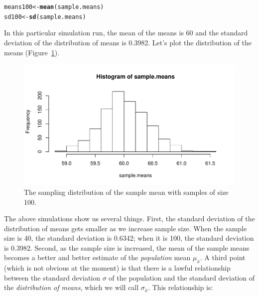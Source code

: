 \documentclass[12pt]{book}\usepackage[]{graphicx}\usepackage[]{color}
\makeatletter
\def\maxwidth{ %
  \ifdim\Gin@nat@width>\linewidth
    \linewidth
  \else
    \Gin@nat@width
  \fi
}
\newcommand{\hlstd}[1]{\textcolor[rgb]{0.345,0.345,0.345}{#1}}%
\newcommand{\hlkwb}[1]{\textcolor[rgb]{0.69,0.353,0.396}{#1}}%
\newcommand{\hlkwd}[1]{\textcolor[rgb]{0.737,0.353,0.396}{\textbf{#1}}}%
\newenvironment{kframe}{%
 \def\at@end@of@kframe{}%
 \ifinner\ifhmode%
  \def\at@end@of@kframe{\end{minipage}}%
  \begin{minipage}{\columnwidth}%
 \fi\fi%
 \def\FrameCommand##1{\hskip\@totalleftmargin \hskip-\fboxsep
 \colorbox{shadecolor}{##1}\hskip-\fboxsep
     \hskip-\linewidth \hskip-\@totalleftmargin \hskip\columnwidth}%
 \MakeFramed {\advance\hsize-\width
   \@totalleftmargin\z@ \linewidth\hsize
   \@setminipage}}%
 {\par\unskip\endMakeFramed%
 \at@end@of@kframe}
\newenvironment{knitrout}{}{} %
\makeatother
\begin{document}
\begin{knitrout}
\color{fgcolor}\begin{kframe}
\begin{alltt}
\hlstd{means100} \hlkwb{<-} \hlkwd{mean}\hlstd{(sample.means)}
\hlstd{sd100} \hlkwb{<-} \hlkwd{sd}\hlstd{(sample.means)}
\end{alltt}
\end{kframe}
\end{knitrout}


In this particular simulation run, the mean of the means is
60 
and the standard deviation of the
distribution of means is 0.3982. Let's plot
the distribution of the means (Figure~\ref{fig:sdsmplot100}).



\begin{figure}[!htbp]
\centering
\begin{knitrout}
\color{fgcolor}
\includegraphics[width=\maxwidth]{figure/unnamed-chunk-19-1} 

\end{knitrout}
\caption{The sampling distribution of the sample mean with samples of size
100.} \label{fig:sdsmplot100}
\end{figure}

The above simulations show us several things. First, the standard
deviation of the distribution of means gets smaller as we increase
sample size.  When the sample size is 40, the standard deviation is
0.6342; when it is 100, the standard deviation
is 0.3982.  Second, as the sample size is
increased, the mean of the sample means 
becomes a better and better estimate of the
\textit{population} mean $\mu_{\bar{x}}$.  A third point (which is not obvious at the
moment) is that there is a lawful relationship between the standard
deviation $\sigma$ of the population and the standard deviation of the
\textit{distribution of means}, which we will call $\sigma_{\bar{x}}$. 
This relationship is:
\end{document}
